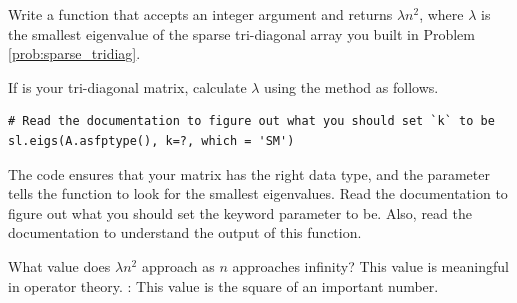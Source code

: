 \begin{problem}
Write a function that accepts an integer argument  and returns $\lambda n^2$, where
$\lambda$ is the smallest eigenvalue of the sparse tri-diagonal array you built in Problem \ref{prob:sparse_tridiag}.

If  is your tri-diagonal matrix, calculate $\lambda$ using the method  as follows.
\begin{lstlisting}
# Read the documentation to figure out what you should set `k` to be
sl.eigs(A.asfptype(), k=?, which = 'SM')
\end{lstlisting}
The code  ensures that your matrix has the right data type, and the parameter  tells the function to look for the smallest eigenvalues. Read the documentation to figure out what you should set the keyword parameter  to be. Also, read the documentation to understand the output of this function.

What value does $\lambda n^2$ approach as $n$ approaches infinity? This value is meaningful in operator theory. : This value is the square of an important number.

\end{problem}





 

